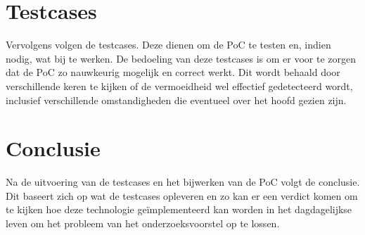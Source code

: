 \section{Testcases}
Vervolgens volgen de testcases. Deze dienen om de PoC te testen en, indien nodig, wat bij te werken. De bedoeling van deze testcases is om er voor te zorgen dat de PoC zo nauwkeurig mogelijk en correct werkt. Dit wordt behaald door verschillende keren te kijken of de vermoeidheid wel effectief gedetecteerd wordt, inclusief verschillende omstandigheden die eventueel over het hoofd gezien zijn.

\section{Conclusie}
Na de uitvoering van de testcases en het bijwerken van de PoC volgt de conclusie. Dit baseert zich op wat de testcases opleveren en zo kan er een verdict komen om te kijken hoe deze technologie geïmplementeerd kan worden in het dagdagelijkse leven om het probleem van het onderzoeksvoorstel op te lossen.





